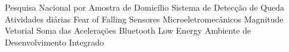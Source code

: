 \begin{acronym}[ACRONYM] 

 { Pesquisa Nacional por Amostra de Domicílio }
 {Sistema de Detecção de Queda}
 {Atividades diárias}
 {Fear of Falling}
 { Sensores Microeletromecânicos }
 { Magnitude Vetorial }
 {Soma das Acelerações}
 {Bluetooth Low Energy}
 {Ambiente de Desenvolvimento Integrado}

    
\end{acronym}